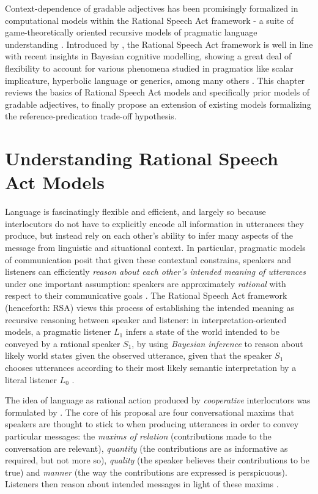 Context-dependence of gradable adjectives has been promisingly formalized in computational models within the Rational Speech Act framework -  a suite of game-theoretically oriented recursive models of pragmatic language understanding \parencite[e.g.,][]{goodman2016, lassiter2017adjectival, tessler2017warm}. Introduced by \textcite{frank2012predicting}, the Rational Speech Act framework is well in line with recent insights in Bayesian cognitive modelling, showing a great deal of flexibility to account for various phenomena studied in pragmatics like scalar implicature, hyperbolic language or generics, among many others \parencite[e.g.,][]{tenenbaum2011grow, problang}. This chapter reviews the basics of Rational Speech Act models and specifically prior models of gradable adjectives, to finally propose an extension of existing models formalizing the reference-predication trade-off hypothesis.%
  
\section{Understanding Rational Speech Act Models}

Language is fascinatingly flexible and efficient, and largely so because interlocutors do not have to explicitly encode all information in utterances they produce, but instead rely on each other's ability to infer many aspects of the message from linguistic and situational context. In particular, pragmatic models of communication posit that given these contextual constrains, speakers and listeners can efficiently \emph{reason about each other's intended meaning of utterances} under one important assumption: speakers are approximately \emph{rational} with respect to their communicative goals \parencite{frank2012predicting}. The Rational Speech Act framework (henceforth: RSA) views this process of establishing the intended meaning as recursive reasoning between speaker and listener: in interpretation-oriented models, a pragmatic listener $L_1$ infers a state of the world intended to be conveyed by a rational speaker $S_1$, by using \emph{Bayesian inference} to reason about likely world states given the observed utterance, given that the speaker $S_1$ chooses utterances according to their most likely semantic interpretation by a literal listener $L_0$ \parencite{problang}.  

The idea of language as rational action produced by \emph{cooperative} interlocutors was formulated by \textcite{grice1975logic}. The core of his proposal are four conversational maxims that speakers are thought to stick to when producing utterances in order to convey particular messages: the \emph{maxims of relation} (contributions made to the conversation are relevant), \emph{quantity} (the contributions are as informative as required, but not more so), \emph{quality} (the speaker believes their contributions to be true) and \emph{manner} (the way the contributions are expressed is perspicuous). Listeners then reason about intended messages in light of these maxims \parencite{grice1975logic}.

